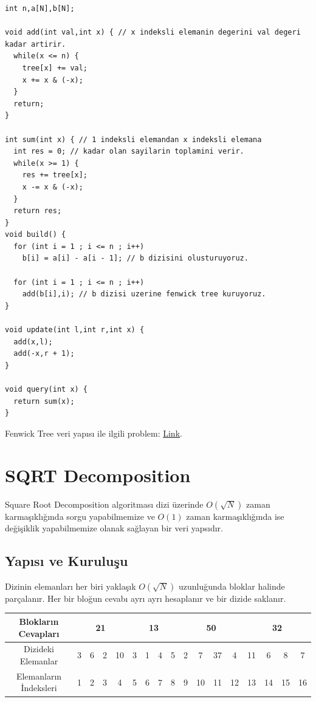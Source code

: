 \documentclass[12pt]{article}
\begin{document}
    \begin{verbatim}
int n,a[N],b[N];

void add(int val,int x) { // x indeksli elemanin degerini val degeri kadar artirir.
  while(x <= n) {
    tree[x] += val;
    x += x & (-x);
  }
  return;
}

int sum(int x) { // 1 indeksli elemandan x indeksli elemana
  int res = 0; // kadar olan sayilarin toplamini verir.
  while(x >= 1) {
    res += tree[x];
    x -= x & (-x);
  }
  return res;
}
void build() {
  for (int i = 1 ; i <= n ; i++)
    b[i] = a[i] - a[i - 1]; // b dizisini olusturuyoruz.

  for (int i = 1 ; i <= n ; i++)
    add(b[i],i); // b dizisi uzerine fenwick tree kuruyoruz.
}

void update(int l,int r,int x) {
  add(x,l);
  add(-x,r + 1);
}

void query(int x) {
  return sum(x);
}

    \end{verbatim}
    
    Fenwick Tree veri yap{\i}s{\i} ile ilgili problem: \href{https://www.spoj.com/problems/CSUMQ/}{Link}.
    \cleardoublepage

	\section{SQRT Decomposition}
	
	Square Root Decomposition algoritmas{\i} dizi \"{u}zerinde $O(\sqrt{N})$ zaman karma\c{s}{\i}kl{\i}\u{g}{\i}nda sorgu yapabilmemize ve $O(1)$ zaman karma\c{s}{\i}kl{\i}\u{g}{\i}nda ise de\u{g}i\c{s}iklik yapabilmemize olanak sa\u{g}layan bir veri yaps{\i}d{\i}r.
	
	\subsection{Yap{\i}s{\i} ve Kurulu\c{s}u}
	
	Dizinin elemanlar{\i} her biri yakla\c{s}{\i}k $O(\sqrt{N})$ uzunlu\u{g}unda bloklar halinde par\c{c}alan{\i}r. Her bir blo\u{g}un cevab{\i} ayr{\i} ayr{\i} hesaplan{\i}r ve bir dizide saklan{\i}r.
	
    \begin{table}[h]
    \centering
    \begin{tabular}{|c|c|c|c|c|c|c|c|c|c|c|c|c|c|c|c|c|}
    \hline
    Bloklar{\i}n Cevaplar{\i}   & \multicolumn{4}{c|}{21} & \multicolumn{4}{c|}{13} & \multicolumn{4}{c|}{50} & \multicolumn{4}{c|}{32} \\ \hline
    Dizideki Elemanlar     & 3    & 6   & 2   & 10   & 3    & 1    & 4   & 5   & 2   & 7    & 37   & 4   & 11   & 6    & 8   & 7   \\ \hline
    Elemanlar{\i}n \.{I}ndeksleri & 1    & 2   & 3   & 4    & 5    & 6    & 7   & 8   & 9   & 10   & 11   & 12  & 13   & 14   & 15  & 16  \\ \hline
    \end{tabular}
    \end{table}
    
\end{document}
